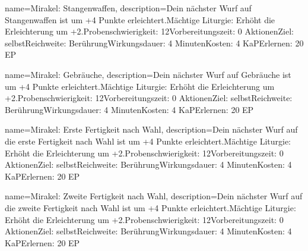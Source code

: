 {
    name={Mirakel: Stangenwaffen},
    description={Dein nächster Wurf auf Stangenwaffen ist um +4 Punkte erleichtert.\newline Mächtige Liturgie: Erhöht die Erleichterung um +2.\newline Probenschwierigkeit: 12\newline Vorbereitungszeit: 0 Aktionen\newline Ziel: selbst\newline Reichweite: Berührung\newline Wirkungsdauer: 4 Minuten\newline Kosten: 4 KaP\newline Erlernen: 20 EP}
}


{
    name={Mirakel: Gebräuche},
    description={Dein nächster Wurf auf Gebräuche ist um +4 Punkte erleichtert.\newline Mächtige Liturgie: Erhöht die Erleichterung um +2.\newline Probenschwierigkeit: 12\newline Vorbereitungszeit: 0 Aktionen\newline Ziel: selbst\newline Reichweite: Berührung\newline Wirkungsdauer: 4 Minuten\newline Kosten: 4 KaP\newline Erlernen: 20 EP}
}


{
    name={Mirakel: Erste Fertigkeit nach Wahl},
    description={Dein nächster Wurf auf die erste Fertigkeit nach Wahl ist um +4 Punkte erleichtert.\newline Mächtige Liturgie: Erhöht die Erleichterung um +2.\newline Probenschwierigkeit: 12\newline Vorbereitungszeit: 0 Aktionen\newline Ziel: selbst\newline Reichweite: Berührung\newline Wirkungsdauer: 4 Minuten\newline Kosten: 4 KaP\newline Erlernen: 20 EP}
}


{
    name={Mirakel: Zweite Fertigkeit nach Wahl},
    description={Dein nächster Wurf auf die zweite Fertigkeit nach Wahl ist um +4 Punkte erleichtert.\newline Mächtige Liturgie: Erhöht die Erleichterung um +2.\newline Probenschwierigkeit: 12\newline Vorbereitungszeit: 0 Aktionen\newline Ziel: selbst\newline Reichweite: Berührung\newline Wirkungsdauer: 4 Minuten\newline Kosten: 4 KaP\newline Erlernen: 20 EP}
}


